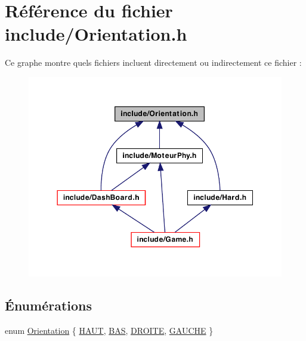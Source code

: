 \hypertarget{a00032}{
\section{Référence du fichier include/Orientation.h}
\label{a00032}
}
Ce graphe montre quels fichiers incluent directement ou indirectement ce fichier :
\nopagebreak
\begin{figure}[H]
\begin{center}
\leavevmode
\includegraphics[width=351pt]{a00065}
\end{center}
\end{figure}
\subsection*{Énumérations}
\begin{DoxyCompactItemize}
\item 
enum \hyperlink{a00032_a871118a09520247c78a71ecd7b0abd58}{Orientation} \{ \hyperlink{a00032_a871118a09520247c78a71ecd7b0abd58a5c97701a87d36c8f2c0de80c5865b8e2}{HAUT}, 
\hyperlink{a00032_a871118a09520247c78a71ecd7b0abd58a4b07baad9e862178efeac3e522475caa}{BAS}, 
\hyperlink{a00032_a871118a09520247c78a71ecd7b0abd58a79f680205087956546ae263797bd1343}{DROITE}, 
\hyperlink{a00032_a871118a09520247c78a71ecd7b0abd58a4ee960d97b04a1f22ed7ff81c7aa2e86}{GAUCHE}
 \}
\end{DoxyCompactItemize}


